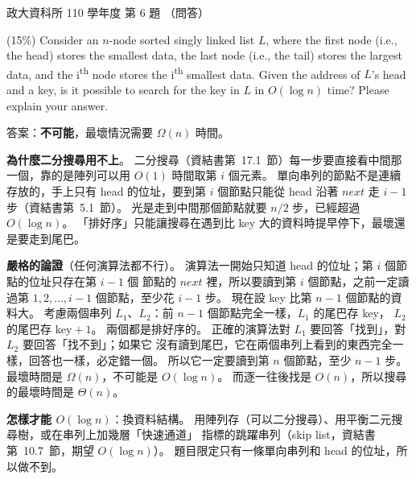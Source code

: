 \begin{pastexam}[label={px:nccu-110-dsa-06}]{政大資科所 110 學年度 第 6 題}
（問答）

(15\%) Consider an $n$-node sorted singly linked list $L$, where the first node (i.e., the head) stores
the smallest data, the last node (i.e., the tail) stores the largest data, and the
i\textsuperscript{th} node stores the i\textsuperscript{th} smallest data. Given the address of $L$'s
head and a key, is it possible to search for the key in $L$ in $O(\log n)$ time? Please explain your
answer.
\end{pastexam}

\begin{pastsoln}
答案：\textbf{不可能}，最壞情況需要 $\Omega(n)$ 時間。

\textbf{為什麼二分搜尋用不上}。 二分搜尋（資結書第~17.1~節）每一步要直接看中間那一個，靠的是陣列可以用 $O(1)$
時間取第 $i$ 個元素。 單向串列的節點不是連續存放的，手上只有 head 的位址，要到第 $i$ 個節點只能從 head 沿著
$\mathit{next}$ 走 $i - 1$ 步（資結書第~5.1~節）。 光是走到中間那個節點就要 $n/2$ 步，已經超過 $O(\log n)$。
「排好序」只能讓搜尋在遇到比 key 大的資料時提早停下，最壞還是要走到尾巴。

\textbf{嚴格的論證}（任何演算法都不行）。 演算法一開始只知道 head 的位址；第 $i$ 個節點的位址只存在第 $i - 1$ 個
節點的 $\mathit{next}$ 裡，所以要讀到第 $i$ 個節點，之前一定讀過第 $1, 2, \ldots, i - 1$ 個節點，至少花 $i - 1$ 步。
現在設 key 比第 $n - 1$ 個節點的資料大。 考慮兩個串列 $L_1$、$L_2$：前 $n - 1$ 個節點完全一樣，$L_1$ 的尾巴存 key，
$L_2$ 的尾巴存 key${}+1$。 兩個都是排好序的。 正確的演算法對 $L_1$ 要回答「找到」，對 $L_2$ 要回答「找不到」；如果它
沒有讀到尾巴，它在兩個串列上看到的東西完全一樣，回答也一樣，必定錯一個。 所以它一定要讀到第 $n$ 個節點，至少
$n - 1$ 步。 最壞時間是 $\Omega(n)$，不可能是 $O(\log n)$。 而逐一往後找是 $O(n)$，所以搜尋的最壞時間是 $\Theta(n)$。

\textbf{怎樣才能 $O(\log n)$}：換資料結構。 用陣列存（可以二分搜尋）、用平衡二元搜尋樹，或在串列上加幾層「快速通道」
指標的跳躍串列（skip list，資結書第~10.7~節，期望 $O(\log n)$）。 題目限定只有一條單向串列和 head 的位址，所以做不到。
\end{pastsoln}
